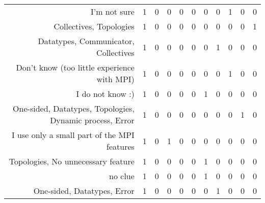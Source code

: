 {\begin{landscape}
\begin{longtable}[htb]{r|c|c|c|c|c|c|c|c|c|c}
{I'm not sure} & 1 & 0 & 0 & 0 & 0 & 0 & 0 & 1 & 0 & 0 \\%
{Collectives, Topologies} & 1 & 0 & 0 & 0 & 0 & 0 & 0 & 0 & 0 & 1 \\%
{Datatypes, Communicator, Collectives} & 1 & 0 & 0 & 0 & 0 & 0 & 1 & 0 & 0 & 0 \\%
{Don't know (too little experience with MPI)} & 1 & 0 & 0 & 0 & 0 & 0 & 0 & 1 & 0 & 0 \\%
{I do not know :)} & 1 & 0 & 0 & 0 & 0 & 1 & 0 & 0 & 0 & 0 \\%
{One-sided, Datatypes, Topologies, Dynamic process, Error} & 1 & 0 & 0 & 0 & 0 & 0 & 0 & 0 & 1 & 0 \\%
{I use only a small part of the MPI features} & 1 & 0 & 1 & 0 & 0 & 0 & 0 & 0 & 0 & 0 \\%
{Topologies, No unnecessary feature} & 1 & 0 & 0 & 0 & 0 & 1 & 0 & 0 & 0 & 0 \\%
{no clue} & 1 & 0 & 0 & 0 & 0 & 1 & 0 & 0 & 0 & 0 \\%
{One-sided, Datatypes, Error} & 1 & 0 & 0 & 0 & 0 & 0 & 1 & 0 & 0 & 0 \\%
\hline%
\end{longtable}%
\end{landscape}}%
\clearpage%

